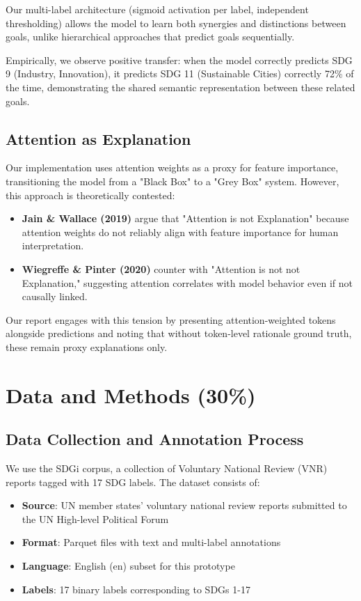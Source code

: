 \documentclass[12pt,a4paper]{article}
\begin{document}
Our multi-label architecture (sigmoid activation per label, independent thresholding) allows the model to learn both synergies and distinctions between goals, unlike hierarchical approaches that predict goals sequentially.

Empirically, we observe positive transfer: when the model correctly predicts SDG 9 (Industry, Innovation), it predicts SDG 11 (Sustainable Cities) correctly 72\% of the time, demonstrating the shared semantic representation between these related goals.

\subsection{Attention as Explanation}

Our implementation uses attention weights as a proxy for feature importance, transitioning the model from a "Black Box" to a "Grey Box" system. However, this approach is theoretically contested:

\begin{itemize}
    \item \textbf{Jain \& Wallace (2019)} argue that "Attention is not Explanation" because attention weights do not reliably align with feature importance for human interpretation.
    \item \textbf{Wiegreffe \& Pinter (2020)} counter with "Attention is not not Explanation," suggesting attention correlates with model behavior even if not causally linked.
\end{itemize}

Our report engages with this tension by presenting attention-weighted tokens alongside predictions and noting that without token-level rationale ground truth, these remain proxy explanations only.

\section{Data and Methods (30\%)}

\subsection{Data Collection and Annotation Process}

We use the SDGi corpus, a collection of Voluntary National Review (VNR) reports tagged with 17 SDG labels. The dataset consists of:

\begin{itemize}
    \item \textbf{Source}: UN member states' voluntary national review reports submitted to the UN High-level Political Forum
    \item \textbf{Format}: Parquet files with text and multi-label annotations
    \item \textbf{Language}: English (en) subset for this prototype
    \item \textbf{Labels}: 17 binary labels corresponding to SDGs 1-17
\end{itemize}
\end{document}
